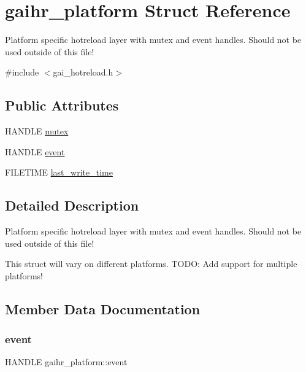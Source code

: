 \hypertarget{structgaihr__platform}{}\section{gaihr\+\_\+platform Struct Reference}
\label{structgaihr__platform}


Platform specific hotreload layer with mutex and event handles. Should not be used outside of this file!  




{\ttfamily \#include $<$gai\+\_\+hotreload.\+h$>$}

\subsection*{Public Attributes}
\begin{DoxyCompactItemize}
\item 
H\+A\+N\+D\+LE \hyperlink{structgaihr__platform_a4502c637972f49cbb803c93975fe45f4}{mutex}
\item 
H\+A\+N\+D\+LE \hyperlink{structgaihr__platform_a702622bb26128f36b2c27c8ffdb1b7a0}{event}
\item 
F\+I\+L\+E\+T\+I\+ME \hyperlink{structgaihr__platform_a6be2e4d6d98523e09c04a19b20d04cd1}{last\+\_\+write\+\_\+time}
\end{DoxyCompactItemize}


\subsection{Detailed Description}
Platform specific hotreload layer with mutex and event handles. Should not be used outside of this file! 

This struct will vary on different platforms. T\+O\+DO\+: Add support for multiple platforms! 

\subsection{Member Data Documentation}
\mbox{\label{structgaihr__platform_a702622bb26128f36b2c27c8ffdb1b7a0}} 
\subsubsection{\texorpdfstring{event}{event}}
{\footnotesize\ttfamily H\+A\+N\+D\+LE gaihr\+\_\+platform\+::event}

